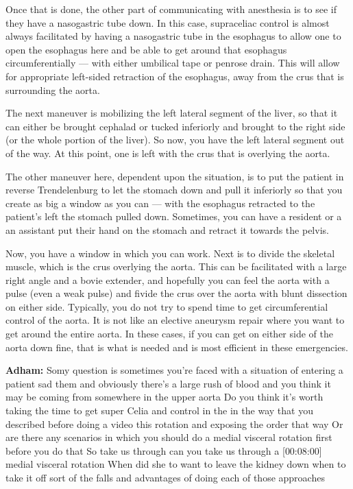 \documentclass[
]{book}
\begin{document}
Once that is done, the other part of
communicating with anesthesia is to see if they have a nasogastric
tube down. In this case, supraceliac control is almost always
facilitated by having a nasogastric tube in the esophagus to allow one
to open the esophagus here and be able to
get around that esophagus circumferentially --- with either umbilical tape or penrose drain. This will allow for appropriate left-sided retraction of the esophagus, away from the crus that is surrounding the aorta.

The next maneuver is mobilizing the left lateral segment of the liver, so that it can either be brought
cephalad or tucked inferiorly and brought to the right side (or the whole portion of the liver). So now,
you have the left lateral segment out of the way. At this point, one is left with the crus that is overlying the aorta.

The other maneuver here, dependent upon the situation, is to put
the patient in reverse Trendelenburg to let the stomach
down and pull it inferiorly so that you create as big a
window as you can --- with the esophagus retracted to the patient's left
the stomach pulled down. Sometimes, you can have a resident or a
an assistant put their hand on the stomach and retract it
towards the pelvis.

Now, you have a window in which you can work. Next is to divide the skeletal muscle, which is the crus overlying the
aorta. This can be facilitated with a large right angle and a bovie extender, and hopefully you can feel the aorta with a pulse (even a weak pulse) and fivide the crus over the aorta with blunt dissection on either side. Typically, you do not try to spend time to get circumferential control of the aorta. It is not like an elective aneurysm repair where you want to get around the entire aorta. In these cases, if you can get on either side of the aorta down fine, that is what is needed and is most efficient in these emergencies.

\textbf{Adham:} Somy question is sometimes you're faced with a situation of
entering a patient sad them and obviously there's a large rush of blood
and you think it may be coming from somewhere in the upper aorta Do you
think it's worth taking the time to get super Celia and control in the
in the way that you described before doing a video this rotation and
exposing the order that way Or are there any scenarios in which you
should do a medial visceral rotation first before you do that So take us
through can you take us through a {[}00:08:00{]} medial visceral rotation
When did she to want to leave the kidney down when to take it off sort
of the falls and advantages of doing each of those approaches
\end{document}
